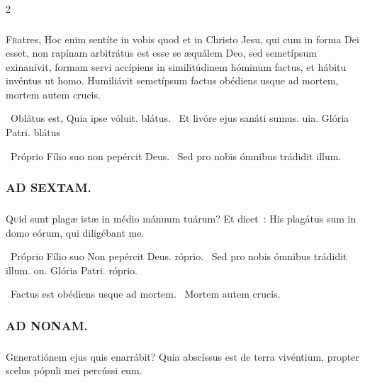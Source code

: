 \documentclass[9pt,twoside]{extarticle}
\begin{document}
\begin{multicols}{2}
{{\subsubsection*{}
\lettrine{F}ratres, Hoc enim sentíte in vobis quod et in Christo Jesu, qui cum in forma Dei esset, non rapínam arbitrátus est esse se æquálem Deo, sed semetípsum exinanívit, formam servi accípiens in similitúdinem hóminum factus, et hábitu invéntus ut homo. Humiliávit semetípsum factus obédiens usque ad mortem, mortem autem crucis.

\begin{tightlist}{}
\item {}~Oblátus est, \textred{*} Quia ipse vóluit. blátus. ~Et livóre ejus sanáti sumus. uia. Glória Patri. blátus
\item {}~Próprio Fílio suo non pepércit Deus. ~Sed pro nobis ómnibus trádidit illum.
\end{tightlist}

\subsubsection*{\center \textsc{AD SEXTAM.}}
\subsubsection*{}
\lettrine{Q}uid sunt plagæ istæ in médio mánuum tuárum? Et dicet~: His plagátus sum in domo eórum, qui diligébant me.

\begin{tightlist}{}
\item {}~Próprio Fílio suo \textred{*} Non pepércit Deus. róprio. ~Sed pro nobis ómnibus trádidit illum. on. Glória Patri. róprio.
\item {}~Factus est obédiens usque ad mortem. ~Mortem autem crucis.
\end{tightlist}

\subsubsection*{\center \textsc{AD NONAM.}}
\subsubsection*{}
\lettrine{G}eneratiónem ejus quis enarrábit? Quia abscíssus est de terra vivéntium, propter scelus pópuli mei percússi eum.

}}
\end{multicols}
\end{document}
